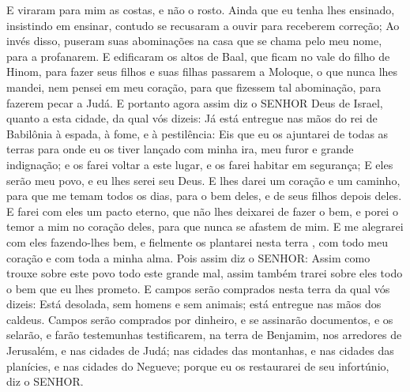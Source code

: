 {E viraram para mim as costas, e não o rosto. Ainda que eu tenha lhes ensinado, insistindo em ensinar, contudo se recusaram a ouvir para receberem correção;
Ao invés disso, puseram suas abominações na casa que se chama pelo meu nome, para a profanarem.
E edificaram os altos de Baal, que ficam no vale do filho de Hinom, para fazer seus filhos e suas filhas passarem
{} a Moloque, o que nunca lhes mandei, nem pensei em meu coração, para que fizessem tal abominação, para fazerem pecar a Judá.
E portanto agora assim diz o SENHOR Deus de Israel, quanto a esta cidade, da qual vós dizeis: Já está entregue nas mãos do rei de Babilônia à espada, à fome, e à pestilência:
Eis que eu os ajuntarei de todas as terras para onde eu os tiver lançado com minha ira, meu furor e grande indignação; e os farei voltar a este lugar, e os farei habitar em segurança;
E eles serão meu povo, e eu lhes serei seu Deus.
E lhes darei um
{} coração e um
{} caminho, para que me temam todos os dias, para o bem deles, e de seus filhos depois deles.
E farei com eles um pacto eterno, que não lhes deixarei
 de fazer o bem, e porei o temor a mim no coração deles, para que nunca se afastem de mim.
E me alegrarei com eles fazendo-lhes bem, e fielmente os plantarei nesta terra , com todo meu coração e com toda a minha alma.
Pois assim diz o SENHOR: Assim como trouxe sobre este povo todo este grande mal, assim também trarei sobre eles todo o bem que eu lhes prometo.
E campos serão comprados nesta terra da qual vós dizeis: Está desolada, sem homens e sem animais; está entregue nas mãos dos caldeus.
Campos serão comprados por dinheiro, e se assinarão documentos, e os selarão, e farão testemunhas testificarem, na terra de Benjamim, nos arredores de Jerusalém, e nas cidades de Judá; nas cidades das montanhas, e nas cidades das planícies, e nas cidades do Negueve; porque eu os restaurarei de seu infortúnio, diz o SENHOR.

\par }

